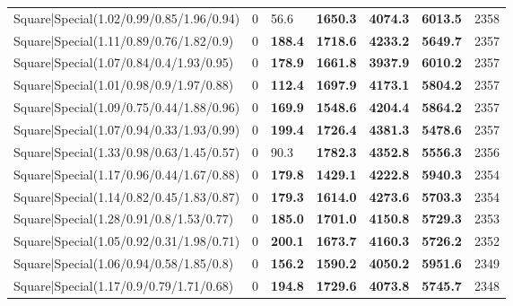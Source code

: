 \begin{tabular}{lrllllr}
 Square|Special(1.02/0.99/0.85/1.96/0.94)                      &             0   & 56.6           & \textbf{1650.3} & \textbf{4074.3} & \textbf{6013.5} &         2358 \\
 Square|Special(1.11/0.89/0.76/1.82/0.9)                       &             0   & \textbf{188.4} & \textbf{1718.6} & \textbf{4233.2} & \textbf{5649.7} &         2357 \\
 Square|Special(1.07/0.84/0.4/1.93/0.95)                       &             0   & \textbf{178.9} & \textbf{1661.8} & \textbf{3937.9} & \textbf{6010.2} &         2357 \\
 Square|Special(1.01/0.98/0.9/1.97/0.88)                       &             0   & \textbf{112.4} & \textbf{1697.9} & \textbf{4173.1} & \textbf{5804.2} &         2357 \\
 Square|Special(1.09/0.75/0.44/1.88/0.96)                      &             0   & \textbf{169.9} & \textbf{1548.6} & \textbf{4204.4} & \textbf{5864.2} &         2357 \\
 Square|Special(1.07/0.94/0.33/1.93/0.99)                      &             0   & \textbf{199.4} & \textbf{1726.4} & \textbf{4381.3} & \textbf{5478.6} &         2357 \\
 Square|Special(1.33/0.98/0.63/1.45/0.57)                      &             0   & 90.3           & \textbf{1782.3} & \textbf{4352.8} & \textbf{5556.3} &         2356 \\
 Square|Special(1.17/0.96/0.44/1.67/0.88)                      &             0   & \textbf{179.8} & \textbf{1429.1} & \textbf{4222.8} & \textbf{5940.3} &         2354 \\
 Square|Special(1.14/0.82/0.45/1.83/0.87)                      &             0   & \textbf{179.3} & \textbf{1614.0} & \textbf{4273.6} & \textbf{5703.3} &         2354 \\
 Square|Special(1.28/0.91/0.8/1.53/0.77)                       &             0   & \textbf{185.0} & \textbf{1701.0} & \textbf{4150.8} & \textbf{5729.3} &         2353 \\
 Square|Special(1.05/0.92/0.31/1.98/0.71)                      &             0   & \textbf{200.1} & \textbf{1673.7} & \textbf{4160.3} & \textbf{5726.2} &         2352 \\
 Square|Special(1.06/0.94/0.58/1.85/0.8)                       &             0   & \textbf{156.2} & \textbf{1590.2} & \textbf{4050.2} & \textbf{5951.6} &         2349 \\
 Square|Special(1.17/0.9/0.79/1.71/0.68)                       &             0   & \textbf{194.8} & \textbf{1729.6} & \textbf{4073.8} & \textbf{5745.7} &         2348 \\

\end{tabular}
